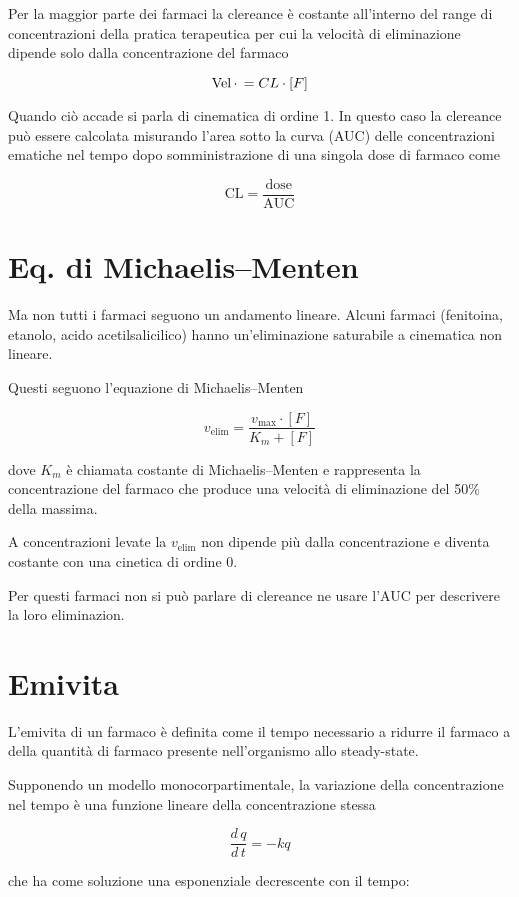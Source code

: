 Per la maggior parte dei farmaci la clereance è costante all'interno del range di concentrazioni della pratica terapeutica per cui la velocità di eliminazione dipende solo dalla concentrazione del farmaco

$$\ce{Vel.} = CL \cdot [F]$$

Quando ciò accade si parla di cinematica di ordine 1. In questo caso la clereance può essere calcolata misurando l'area sotto la curva (AUC) delle concentrazioni ematiche nel tempo dopo somministrazione di una singola dose di farmaco come

$$\text{CL} = \frac{\text{dose}}{\text{AUC}}$$

\section{Eq. di Michaelis--Menten}

Ma non tutti i farmaci seguono un andamento lineare. Alcuni farmaci (fenitoina, etanolo, acido acetilsalicilico) hanno un'eliminazione saturabile a cinematica non lineare.

Questi seguono l'equazione di Michaelis--Menten

$$v_{\text{elim}} = \frac{v_{\text{max}}\cdot [F]}{K_m + [F]}$$

dove $K_m$ è chiamata costante di Michaelis--Menten e rappresenta la concentrazione del farmaco che produce una velocità di eliminazione del 50\% della massima.

A concentrazioni levate la $v_{\text{elim}}$ non dipende più dalla concentrazione e diventa costante con una cinetica di ordine 0. 

Per questi farmaci non si può parlare di clereance ne usare l'AUC per descrivere la loro eliminazion.

\section{Emivita}

L'emivita di un farmaco è definita come il tempo necessario a ridurre
il farmaco a  della quantità di farmaco presente nell'organismo
allo steady-state.

Supponendo un modello monocorpartimentale, la variazione della concentrazione nel tempo è una funzione lineare della concentrazione stessa

$$\frac{d\,q}{d\,t} = -kq$$

che ha come soluzione una esponenziale decrescente con il tempo:


